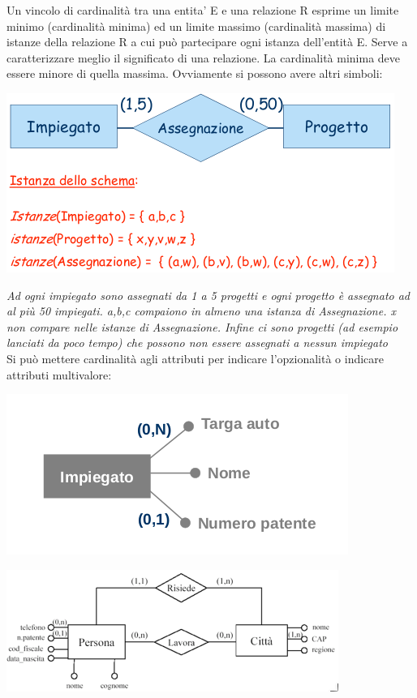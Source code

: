 \documentclass[a4paper,12pt, oneside]{book}
\begin{document}
Un vincolo di cardinalità tra una entita’ E e una relazione R
esprime un limite minimo (cardinalità minima) ed un limite
massimo (cardinalità massima) di istanze della relazione R a cui può partecipare ogni istanza dell'entità E.
Serve a caratterizzare meglio il significato di una relazione. La cardinalità minima deve essere minore di quella massima. Ovviamente si possono avere altri simboli:
\begin{center}
\includegraphics[scale=0.8]{img/er9.png}
\end{center}
\textit{Ad ogni impiegato sono assegnati da 1 a 5 progetti e ogni progetto è assegnato ad al più 50 impiegati. a,b,c compaiono in almeno una istanza di Assegnazione. x non compare nelle istanze di Assegnazione. Infine ci sono progetti (ad esempio lanciati da poco
tempo) che possono non essere assegnati a nessun
impiegato}\\
Si può mettere cardinalità agli attributi per indicare l'opzionalità o indicare attributi multivalore:
\begin{center}
\includegraphics[scale=0.8]{img/er10.png}
\end{center}
\begin{center}
\includegraphics[scale=0.8]{img/er11.png}
\end{center}
\end{document}
